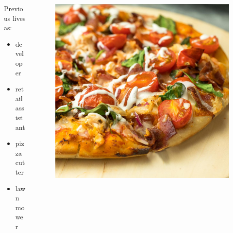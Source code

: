 \documentclass{beamer}
\begin{document}
\begin{frame}
    \begin{columns}
        \begin{column}{0.5\textwidth}
            Previous lives as: 
            \begin{itemize}
                \item developer
                \item retail assistant
                \item pizza cutter
                \item lawn mower
            \end{itemize}
        \end{column}
        \begin{column}{0.5\textwidth}
            \begin{figure}
                \centering
                \includegraphics[width=\textwidth,keepaspectratio]{../resources/pizza.jpg}
            \end{figure}
        \end{column}
    \end{columns}
\end{frame}
\end{document}
